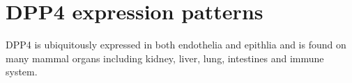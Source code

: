 \section{DPP4 expression patterns}
DPP4 is ubiquitously expressed in both endothelia and epithlia and is found on many mammal organs including kidney, liver, lung, intestines and immune system.~\cite{Abbott1994,Shingu2003,Hong1989,Gutschmidt1981,Dikov2004,Bühling1995,Tanaka1992,Gorrell1991} 
